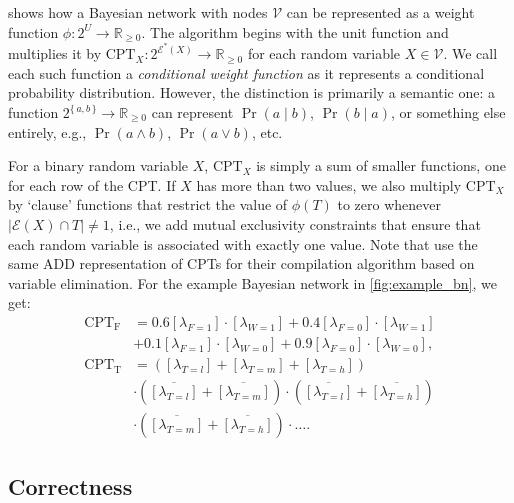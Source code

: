  shows how a Bayesian network with nodes $\mathcal{V}$ can be
represented as a weight function $\phi\colon 2^U \to \mathbb{R}_{\ge 0}$. The
algorithm begins with the unit function and multiplies it by
$\mathrm{CPT}_X\colon 2^{\mathcal{E}^*(X)} \to \mathbb{R}_{\ge 0}$ for each
random variable $X \in \mathcal{V}$. We call each such function a
\emph{conditional weight function} as it represents a conditional probability
distribution. However, the distinction is primarily a semantic one: a function
$2^{\{\, a, b \,\}} \to \mathbb{R}_{\ge 0}$ can represent $\Pr(a \mid b)$,
$\Pr(b \mid a)$, or something else entirely, e.g., $\Pr(a \land b)$,
$\Pr(a \lor b)$, etc.

For a binary random variable $X$, $\mathrm{CPT}_X$ is simply a sum of smaller
functions, one for each row of the CPT\@. If $X$ has more than two values, we
also multiply $\mathrm{CPT}_X$ by `clause' functions that restrict the value of
$\phi(T)$ to zero whenever $|\mathcal{E}(X) \cap T| \ne 1$, i.e., we add mutual
exclusivity constraints that ensure that each random variable is associated with
exactly one value. Note that \citet{DBLP:conf/ijcai/ChaviraD07} use the same ADD
representation of CPTs for their compilation algorithm based on variable
elimination. For the example Bayesian network in \cref{fig:example_bn}, we get:
\begin{align*}
  \mathrm{CPT_F} &= 0.6[\lambda_{F=1}] \cdot [\lambda_{W=1}] + 0.4[\lambda_{F=0}] \cdot [\lambda_{W=1}] \\
                 &+ 0.1[\lambda_{F=1}] \cdot [\lambda_{W=0}] + 0.9[\lambda_{F=0}] \cdot [\lambda_{W=0}], \\
  \mathrm{CPT_T} &= ([\lambda_{T=l}] + [\lambda_{T=m}] + [\lambda_{T=h}]) \\
                 &\cdot (\overline{[\lambda_{T=l}]} + \overline{[\lambda_{T=m}]}) \cdot (\overline{[\lambda_{T=l}]} + \overline{[\lambda_{T=h}]}) \\
                 &\cdot (\overline{[\lambda_{T=m}]} + \overline{[\lambda_{T=h}]}) \cdot \dots.
\end{align*}

\subsection{Correctness}

